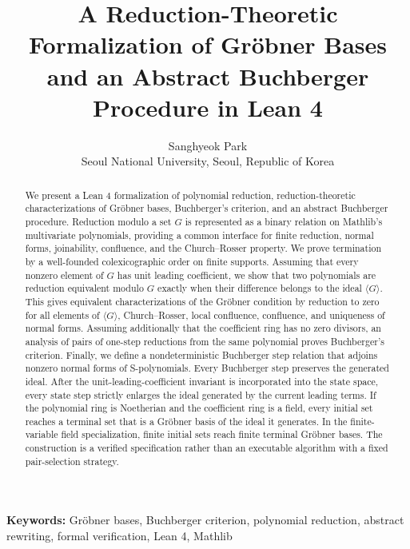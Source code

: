 \documentclass[11pt,a4paper]{article}
\title{A Reduction-Theoretic Formalization of Gr\"obner Bases and an Abstract Buchberger Procedure in Lean 4}
\author{Sanghyeok Park\\
Seoul National University, Seoul, Republic of Korea}
\date{}
\newcommand{\ideal}[1]{\langle #1 \rangle}
\theoremstyle{plain}
\theoremstyle{definition}
\begin{document}
\maketitle

\begin{abstract}
We present a Lean 4 formalization of polynomial reduction, reduction-theoretic
characterizations of Gr\"obner bases, Buchberger's criterion, and an
abstract Buchberger procedure.  Reduction modulo a set $G$ is represented as a binary
relation on Mathlib's multivariate polynomials, providing a common interface
for finite reduction, normal forms, joinability, confluence, and the
Church--Rosser property.  We prove termination by a well-founded
colexicographic order on finite supports.  Assuming that every nonzero element
of $G$ has unit leading coefficient, we show that two polynomials are reduction
equivalent modulo $G$ exactly when their difference belongs to the ideal
$\ideal{G}$.  This gives equivalent characterizations of the Gr\"obner
condition by reduction to zero for all elements of $\ideal{G}$,
Church--Rosser, local confluence, confluence, and uniqueness of normal forms.
Assuming additionally that the coefficient ring has no zero divisors, an
analysis of pairs of one-step reductions from the same polynomial proves
Buchberger's criterion.  Finally, we define a nondeterministic Buchberger step
relation that adjoins nonzero normal forms of S-polynomials.  Every Buchberger
step preserves the generated ideal.  After the unit-leading-coefficient
invariant is incorporated into the state space, every state step strictly
enlarges the ideal generated by the current leading terms.  If the polynomial
ring is Noetherian and the coefficient ring is a field, every initial set
reaches a terminal set that is a Gr\"obner basis of the ideal it generates.  In
the finite-variable field specialization, finite initial sets reach finite
terminal Gr\"obner bases.  The construction is a verified specification rather
than an executable algorithm with a fixed pair-selection strategy.
\end{abstract}

\noindent\textbf{Keywords:} Gr\"obner bases, Buchberger criterion, polynomial reduction,
abstract rewriting, formal verification, Lean 4, Mathlib

\medskip











\small
\setlength{\bibsep}{2pt}


\end{document}
